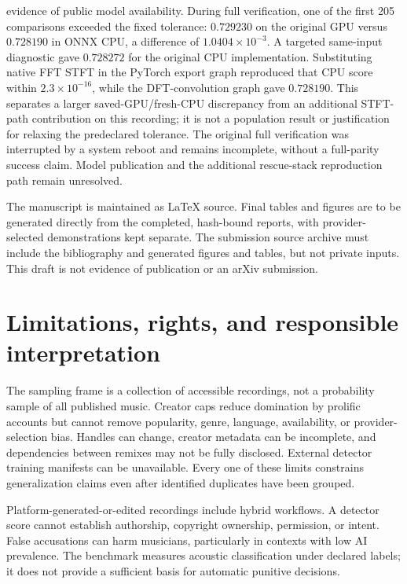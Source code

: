 \documentclass[10pt,a4paper]{article}
\begin{document}
evidence of public model availability. During full verification, one of the
first 205 comparisons exceeded the fixed tolerance: $0.729230$ on the original
GPU versus $0.728190$ in ONNX CPU, a difference of $1.0404\times10^{-3}$.
A targeted same-input diagnostic gave $0.728272$ for the original CPU
implementation. Substituting native FFT STFT in the PyTorch export graph
reproduced that CPU score within $2.3\times10^{-16}$, while the DFT-convolution
graph gave $0.728190$. This separates a larger saved-GPU/fresh-CPU discrepancy
from an additional STFT-path contribution on this recording; it is not a
population result or justification for relaxing the predeclared tolerance.
The original full verification was interrupted by a system reboot and remains
incomplete, without a full-parity success claim. Model publication and the additional rescue-stack reproduction
path remain unresolved.

The manuscript is maintained as LaTeX source. Final tables and figures are to be
generated directly from the completed, hash-bound reports, with provider-selected
demonstrations kept separate. The submission source archive must include the
bibliography and generated figures and tables, but not private inputs. This
draft is not evidence of publication or an arXiv submission.

\section{Limitations, rights, and responsible interpretation}

The sampling frame is a collection of accessible recordings, not a probability
sample of all published music. Creator caps reduce domination by prolific
accounts but cannot remove popularity, genre, language, availability, or
provider-selection bias. Handles can change, creator metadata can be incomplete,
and dependencies between remixes may not be fully disclosed. External detector
training manifests can be unavailable. Every one of these limits constrains
generalization claims even after identified duplicates have been grouped.

Platform-generated-or-edited recordings include hybrid workflows. A detector
score cannot establish authorship, copyright ownership, permission, or intent.
False accusations can harm musicians, particularly in contexts with low AI
prevalence. The benchmark measures acoustic classification under declared
labels; it does not provide a sufficient basis for automatic punitive decisions.
\end{document}
